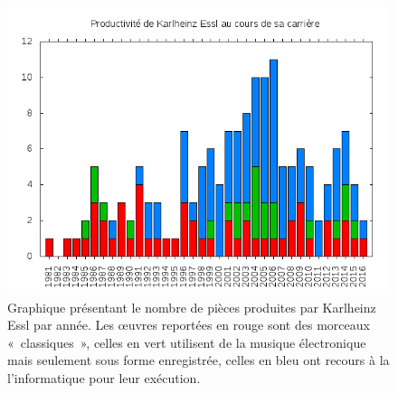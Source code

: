 \documentclass[a4paper,12pt]{article}
\newcommand{\guill}[1]{«~#1~»}
\begin{document}
\begin{figure}[!h]
\begin{center}
\includegraphics[width=12cm]{../Divers/plots/ComputerMusic3.png}
\caption{\footnotesize Graphique présentant le nombre de pièces produites par Karlheinz Essl par année. Les œuvres reportées en rouge sont des morceaux \guill{classiques}, celles en vert utilisent de la musique électronique mais seulement sous forme enregistrée, celles en bleu ont recours à la l'informatique pour leur exécution.}
\label{productivite}
\end{center}
\end{figure}
\end{document}
